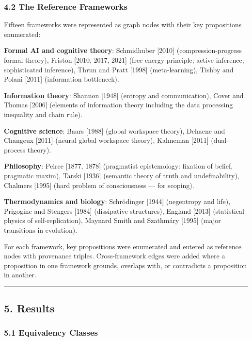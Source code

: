 \documentclass[
]{article}
\begin{document}
\subsubsection{4.2 The Reference
Frameworks}\label{the-reference-frameworks}

Fifteen frameworks were represented as graph nodes with their key
propositions enumerated:

\textbf{Formal AI and cognitive theory}: Schmidhuber {[}2010{]}
(compression-progress formal theory), Friston {[}2010, 2017, 2021{]}
(free energy principle; active inference; sophisticated inference),
Thrun and Pratt {[}1998{]} (meta-learning), Tishby and Polani {[}2011{]}
(information bottleneck).

\textbf{Information theory}: Shannon {[}1948{]} (entropy and
communication), Cover and Thomas {[}2006{]} (elements of information
theory including the data processing inequality and chain rule).

\textbf{Cognitive science}: Baars {[}1988{]} (global workspace theory),
Dehaene and Changeux {[}2011{]} (neural global workspace theory),
Kahneman {[}2011{]} (dual-process theory).

\textbf{Philosophy}: Peirce {[}1877, 1878{]} (pragmatist epistemology:
fixation of belief, pragmatic maxim), Tarski {[}1936{]} (semantic theory
of truth and undefinability), Chalmers {[}1995{]} (hard problem of
consciousness --- for scoping).

\textbf{Thermodynamics and biology}: Schrödinger {[}1944{]} (negentropy
and life), Prigogine and Stengers {[}1984{]} (dissipative structures),
England {[}2013{]} (statistical physics of self-replication), Maynard
Smith and Szathmáry {[}1995{]} (major transitions in evolution).

For each framework, key propositions were enumerated and entered as
reference nodes with provenance triples. Cross-framework edges were
added where a proposition in one framework grounds, overlaps with, or
contradicts a proposition in another.

\begin{center}\rule{0.5\linewidth}{0.5pt}\end{center}

\subsection{5. Results}\label{results}

\subsubsection{5.1 Equivalency Classes}\label{equivalency-classes-1}
\end{document}
